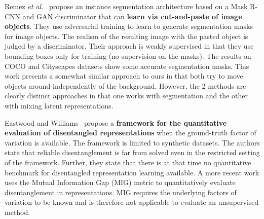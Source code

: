 \documentclass[12pt,a4paper]{article}
\begin{document}
Remez \textit{et al.}~\cite{CutAndPaste} propose an instance segmentation architecture based on a Mask R-CNN and GAN discriminator that can \textbf{learn via cut-and-paste of image objects}. They use adversarial training to learn to generate segmentation masks for image objects. The realism of the resulting image with the pasted object is judged by a discriminator. Their approach is weakly supervised in that they use bounding boxes only for training (no supervision on the masks). The results on COCO and Cityscapes datasets show some accurate segmentation masks. This work presents a somewhat similar approach to ours in that both try to move objects around independently of the background. However, the 2 methods are clearly distinct approaches in that one works with segmentation and the other with mixing latent representations.

\par Eastwood and Williams~\cite{FwkQuantEvalDisRep} propose a \textbf{framework for the quantitative evaluation of disentangled representations} when the ground-truth factor of variation is available. The framework is limited to synthetic datasets. The authors state that reliable disentanglement is far from solved even in the restricted setting of the framework. Further, they state that there is at that time no quantitative benchmark for disentangled representation learning available. A more recent work \cite{SpatialBDecoder} uses the Mutual Information Gap (MIG) metric to quantitatively evaluate disentanglement in representations. MIG requires the underlying factors of variation to be known and is therefore not applicable to evaluate an unsupervised method.
\end{document}
